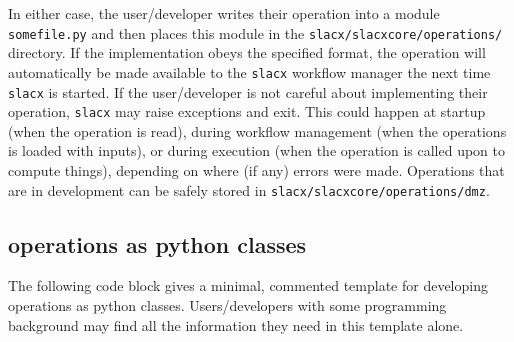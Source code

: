 In either case, the user/developer writes their operation 
into a module \verb|somefile.py|
and then places this module in the \verb|slacx/slacxcore/operations/| directory.
If the implementation obeys the specified format, 
the operation will automatically be made available 
to the \verb|slacx| workflow manager
the next time \verb|slacx| is started.
If the user/developer is not careful 
about implementing their operation,
\verb|slacx| may raise exceptions and exit. 
This could happen at startup (when the operation is read),
during workflow management (when the operations is loaded with inputs),
or during execution (when the operation is called upon to compute things),
depending on where (if any) errors were made.
Operations that are in development 
can be safely stored in \verb|slacx/slacxcore/operations/dmz|.

\subsection{operations as python classes}
\label{sec:op_dev_by_class}

The following code block gives a minimal, 
commented template for developing
operations as python classes.
Users/developers with some programming background
may find all the information they need in this template alone.


